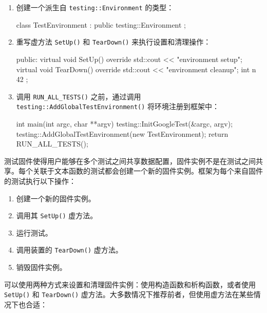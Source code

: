 \begin{enumerate}
\item
创建一个派生自 \verb|testing::Environment| 的类型：

\begin{cpp}
class TestEnvironment : public testing::Environment
{
};
\end{cpp}

\item
重写虚方法 \verb|SetUp()| 和 \verb|TearDown()| 来执行设置和清理操作：

\begin{cpp}
public:
    virtual void SetUp() override
    {
        std::cout << "environment setup\n";
    }
    virtual void TearDown() override
    {
        std::cout << "environment cleanup\n";
    }
    int n{ 42 };
\end{cpp}

\item
调用 \verb|RUN_ALL_TESTS()| 之前，通过调用 \verb|testing::AddGlobalTestEnvironment()| 将环境注册到框架中：

\begin{cpp}
int main(int argc, char **argv)
{
    testing::InitGoogleTest(&argc, argv);
    testing::AddGlobalTestEnvironment(new TestEnvironment{});
    return RUN_ALL_TESTS();
}
\end{cpp}
\end{enumerate}


测试固件使得用户能够在多个测试之间共享数据配置，固件实例不是在测试之间共享。每个关联于文本函数的测试都会创建一个新的固件实例。框架为每个来自固件的测试执行以下操作：

\begin{enumerate}
\item
创建一个新的固件实例。

\item
调用其 \verb|SetUp()| 虚方法。

\item
运行测试。

\item
调用装置的 \verb|TearDown()| 虚方法。

\item
销毁固件实例。
\end{enumerate}

可以使用两种方式来设置和清理固件实例：使用构造函数和析构函数，或者使用 \verb|SetUp()| 和 \verb|TearDown()| 虚方法。大多数情况下推荐前者，但使用虚方法在某些情况下也合适：

